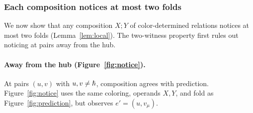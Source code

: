 \subsubsection{Each composition notices at most two folds}\label{ov:twocolors}

We now show that any composition $X;Y$ of color-determined relations
notices at most two folds (Lemma~\ref{lem:local}). The two-witness
property first rules out noticing at pairs away from the hub.

\paragraph{Away from the hub (Figure~\ref{fig:notice}).}
At pairs $(u,v)$ with $u,v\ne\hslash$, composition agrees with
prediction.
Figure~\ref{fig:notice} uses the same coloring, operands $X,Y$, and fold
as Figure~\ref{fig:prediction}, but observes $e'=(u,v_\mu)$.

